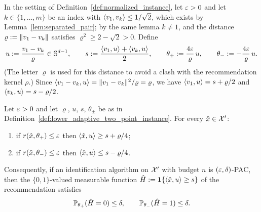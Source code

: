 \begin{definition}\label{def:lower_adaptive_two_point_instance}
In the setting of Definition~\ref{def:normalized_instance}, let $\varepsilon > 0$ and let
$k \in \{1,\dots,m\}$ be an index with $\langle v_1, v_k \rangle \le 1/\sqrt2$, which exists by
Lemma~\ref{lem:separated_pair}; by the same lemma $k \ne 1$, and the distance
$\varrho := \lVert v_1 - v_k \rVert$ satisfies $\varrho^2 \ge 2 - \sqrt2 > 0$. Define
\[
  u := \frac{v_1 - v_k}{\varrho} \in \mathbb{S}^{d-1}, \qquad
  s := \frac{\langle v_1, u \rangle + \langle v_k, u \rangle}{2}, \qquad
  \theta_+ := \frac{4\varepsilon}{\varrho}\, u, \qquad \theta_- := -\frac{4\varepsilon}{\varrho}\, u .
\]
(The letter $\varrho$ is used for this distance to avoid a clash with the recommendation
kernel $\rho$.) Since $\langle v_1 - v_k, u \rangle = \lVert v_1-v_k \rVert^2/\varrho = \varrho$, we have
$\langle v_1, u \rangle = s + \varrho/2$ and $\langle v_k, u \rangle = s - \varrho/2$.
\end{definition}

\begin{lemma}\label{lem:two_point_test}
Let $\varepsilon > 0$ and let $\varrho$, $u$, $s$, $\theta_\pm$ be as in
Definition~\ref{def:lower_adaptive_two_point_instance}. For every $\hat{x} \in \mathcal{X}'$:
\begin{enumerate}
  \item[(i)] if $r(\hat{x},\theta_+) \le \varepsilon$ then $\langle \hat{x}, u \rangle \ge s + \varrho/4$;
  \item[(ii)] if $r(\hat{x},\theta_-) \le \varepsilon$ then $\langle \hat{x}, u \rangle \le s - \varrho/4$.
\end{enumerate}
Consequently, if an identification algorithm on $\mathcal{X}'$ with budget $n$ is
$(\varepsilon,\delta)$-PAC, then the $\{0,1\}$-valued measurable function
$\hat H := \mathbf{1}\{\langle \hat{x}, u \rangle \ge s\}$ of the recommendation satisfies
\[
  \mathbb{P}_{\theta_+}(\hat H = 0) \le \delta, \qquad \mathbb{P}_{\theta_-}(\hat H = 1) \le \delta .
\]
\end{lemma}

